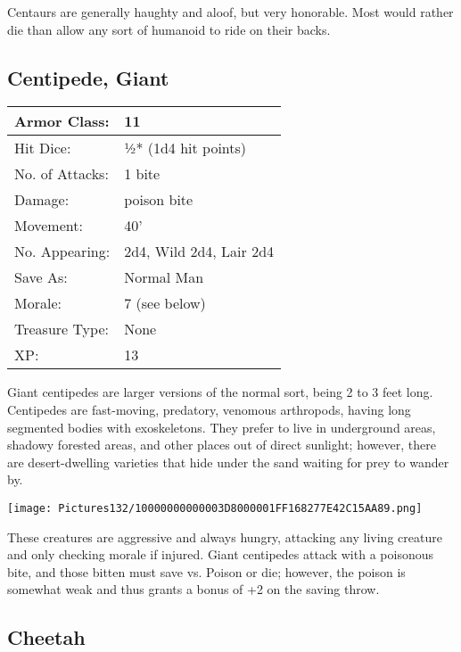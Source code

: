 \documentclass[a4paper,twoside,openany,10pt]{book}
\begin{document}
\begin{multicols}{2}
Centaurs are generally haughty and aloof, but very honorable. Most would rather die than allow any sort of humanoid to ride on their backs.


\subsection*{Centipede, Giant}\label{centipede-giant}

\begin{tabularx}{0.48\textwidth}{@{}lX@{}}
Armor Class: & 11 \\\hline
Hit Dice: & ½* (1d4 hit points) \\\hline
No. of Attacks: & 1 bite \\\hline
Damage: & poison bite \\\hline
Movement: & 40' \\\hline
No. Appearing: & 2d4, Wild 2d4, Lair 2d4 \\\hline
Save As: & Normal Man \\\hline
Morale: & 7 (see below) \\\hline
Treasure Type: & None \\\hline
XP: & 13 \\\hline
\end{tabularx}\medskip

Giant centipedes are larger versions of the normal sort, being 2 to 3 feet long. Centipedes are fast-moving, predatory, venomous arthropods, having long segmented bodies with exoskeletons. They prefer to live in underground areas, shadowy forested areas, and other places out of direct sunlight; however, there are desert-dwelling varieties that hide under the sand waiting for prey to wander by.


\begin{center}
	\texttt{[image: Pictures132/10000000000003D8000001FF168277E42C15AA89.png]}
\end{center}

These creatures are aggressive and always hungry, attacking any living creature and only checking morale if injured. Giant centipedes attack with a poisonous bite, and those bitten must save vs. Poison or die; however, the poison is somewhat weak and thus grants a bonus of +2 on the saving throw.


\subsection*{Cheetah}\label{cheetah}


\end{multicols}
\end{document}
